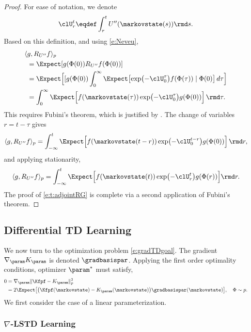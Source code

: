 \begin{proof}
	For ease of notation, we denote
	\[
	\clU_r^t \eqdef \int_{r}^{t} U''(\markovstate(s)) \rmd s.
	\]
	Based on this definition,  and using \eqref{e:Neveu},  
	\begin{equation*}
	\begin{aligned}
	\langle &g, R_{U''}   f \rangle_p 
	\\
	& =\Expect[g(\Phi(0))R_{U''}f(\Phi(0))]
	\\
	& = \Expect\Bigl[  [g(\Phi(0))\int_{0}^{\infty} \Expect\bigl[\exp\bigl(- \clU_0^\tau  \bigr)f(\Phi(\tau)) \mid \Phi(0)\bigr]\,d\tau \Bigr]
	\\
	& =\int_0^\infty \Expect\Bigl[ f(\markovstate(\tau))  \exp\bigl(- \clU_0^\tau  \bigr) g(\Phi(0)) \Bigr]\, \rmd\tau.
	\end{aligned}
	\end{equation*}
	This requires Fubini's theorem, which is justified by . The change of variables $r = t - \tau$ gives
	\[
	\langle g, R_{U''} f \rangle_p =
	\int_{-\infty}^t  \Expect\Bigl[ f(\markovstate(t-r))  \exp \bigl(- \clU_0^{t-r} \bigr) g(\Phi(0))\Bigr]\, \rmd r,
	\]
	and applying stationarity,
	\[
	\langle g, R_{U''} f \rangle_p =
	\int_{-\infty}^t \Expect\Bigl[ f(\markovstate(t)) \exp\bigl(- \clU_r^t \bigr) g(\Phi(r))\Bigr] \rmd r.
	\]
	The proof of \eqref{e:t:adjointRG}
	is complete via a second application of Fubini's theorem.
\end{proof}




\subsection{Differential TD Learning}
We now turn to the optimization problem \eqref{e:gradTDgoal}.  The gradient $\nabla_{\param}K_\param$ is denoted $\gradbasispar $.  Applying the first order optimality conditions, optimizer $\param^*$ must satisfy,
\begin{equation}
\begin{aligned}
0 & = \nabla_{\param} \|\Kfpf - K_{\param}\|_{p}^{2}\\
& = 2 \Expect \bigl[\bigl(\Kfpf(\markovstate) - K_{\param}(\markovstate)\bigr) \gradbasispar (\markovstate)\bigr], \quad \Phi \sim p.
\label{eq_td_derivation}
\end{aligned}
\end{equation}
We first consider the case of a linear parameterization.

\subsubsection*{$\nabla$-LSTD Learning}

